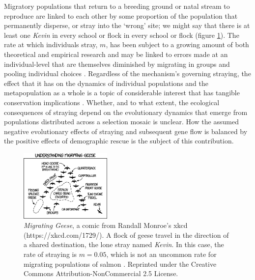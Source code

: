 \documentclass[twocolumn,preprintnumbers,amsmath,amssymb,superscriptaddress]{revtex4}
\begin{document}
Migratory populations that return to a breeding ground or natal stream to reproduce are linked to each other by some proportion of the population that permanently disperse, or stray into the `wrong' site; we might say that there is at least one \emph{Kevin} in every school or flock in every school or flock (figure \ref{fig:xkcd}).
The rate at which individuals stray, $m$, has been subject to a growing amount of both theoretical and empirical research \cite{H:2013fs,Keefer:2014gg,Bett:2017ha} and may be linked to errors made at an individual-level that are themselves diminished by migrating in groups and pooling individual choices \cite{Berdahl:2015kv,Berdahl:2016dx}.
Regardless of the mechanism's governing straying, the effect that it has on the dynamics of individual populations and the metapopulation as a whole is a topic of considerable interest that has tangible conservation implications \cite{Brenner:2012gl,Johnson:2012fe,Fullerton:2011ii}.
Whether, and to what extent, the ecological consequences of straying depend on the evolutionary dynamics that emerge from populations distributed across a selection mosaic is unclear.
How the assumed negative evolutionary effects of straying and subsequent gene flow is balanced by the positive effects of demographic rescue is the subject of this contribution.


\begin{figure}
  \captionsetup{justification=raggedright,
singlelinecheck=false
}
\centering
\includegraphics[width=0.4\textwidth]{figs2/fig_xkcd.png}
\caption{
\emph{Migrating Geese}, a comic from Randall Monroe's xkcd (https://xkcd.com/1729/). 
A flock of geese travel in the direction of a shared destination, the lone stray named \emph{Kevin}.
In this case, the rate of straying is $m=0.05$, which is not an uncommon rate for migrating populations of salmon \cite{Satterthwaite:2015ge}. 
Reprinted under the Creative Commons Attribution-NonCommercial 2.5 License.
} \label{fig:xkcd}
\end{figure}
\end{document}
